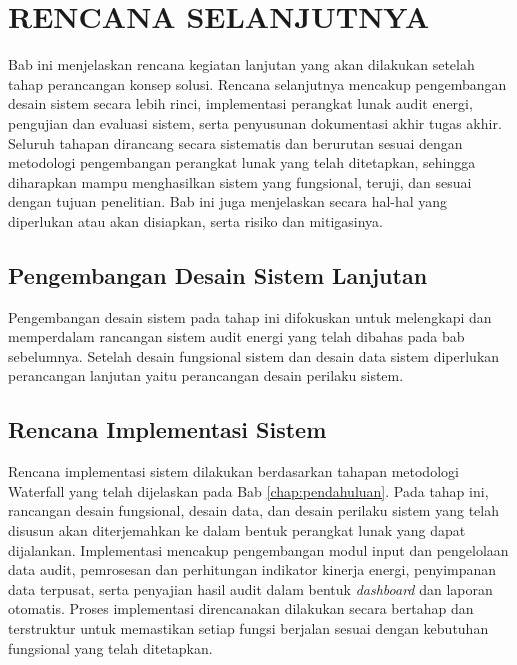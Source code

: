 \chapter{RENCANA SELANJUTNYA}
\label{chap:rencana-selanjutnya}

Bab ini menjelaskan rencana kegiatan lanjutan yang akan dilakukan setelah tahap perancangan konsep solusi. Rencana selanjutnya mencakup pengembangan desain sistem secara lebih rinci, implementasi perangkat lunak audit energi, pengujian dan evaluasi sistem, serta penyusunan dokumentasi akhir tugas akhir. Seluruh tahapan dirancang secara sistematis dan berurutan sesuai dengan metodologi pengembangan perangkat lunak yang telah ditetapkan, sehingga diharapkan mampu menghasilkan sistem yang fungsional, teruji, dan sesuai dengan tujuan penelitian. Bab ini juga menjelaskan secara hal-hal yang diperlukan atau akan disiapkan, serta risiko dan mitigasinya.

\section{Pengembangan Desain Sistem Lanjutan}
Pengembangan desain sistem pada tahap ini difokuskan untuk melengkapi dan memperdalam rancangan sistem audit energi yang telah dibahas pada bab sebelumnya. Setelah desain fungsional sistem dan desain data sistem diperlukan perancangan lanjutan yaitu perancangan desain perilaku sistem.

\section{Rencana Implementasi Sistem}
Rencana implementasi sistem dilakukan berdasarkan tahapan metodologi Waterfall yang telah dijelaskan pada Bab \ref{chap:pendahuluan}. Pada tahap ini, rancangan desain fungsional, desain data, dan desain perilaku sistem yang telah disusun akan diterjemahkan ke dalam bentuk perangkat lunak yang dapat dijalankan. Implementasi mencakup pengembangan modul input dan pengelolaan data audit, pemrosesan dan perhitungan indikator kinerja energi, penyimpanan data terpusat, serta penyajian hasil audit dalam bentuk \textit{dashboard} dan laporan otomatis. Proses implementasi direncanakan dilakukan secara bertahap dan terstruktur untuk memastikan setiap fungsi berjalan sesuai dengan kebutuhan fungsional yang telah ditetapkan.


